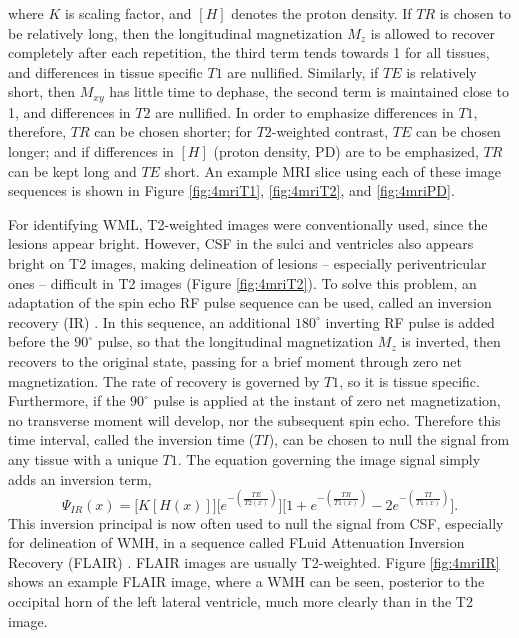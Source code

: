 where $K$ is scaling factor, and $\left[H\right]$ denotes the proton density. If $TR$ is chosen to be relatively long, then the longitudinal magnetization $M_z$ is allowed to recover completely after each repetition, the third term tends towards 1 for all tissues, and differences in tissue specific $T1$ are nullified. Similarly, if $TE$ is relatively short, then $M_{xy}$ has little time to dephase, the second term is maintained close to 1, and differences in $T2$ are nullified. In order to emphasize differences in $T1$, therefore, $TR$ can be chosen shorter; for $T2$-weighted contrast, $TE$ can be chosen longer; and if differences in $[H]$ (proton density, PD) are to be emphasized, $TR$ can be kept long and $TE$ short. An example MRI slice using each of these image sequences is shown in Figure \ref{fig:4mriT1}, \ref{fig:4mriT2}, and \ref{fig:4mriPD}.
\par
For identifying WML, T2-weighted images were conventionally used, since the lesions appear bright. However, CSF in the sulci and ventricles also appears bright on T2 images, making delineation of lesions -- especially periventricular ones -- difficult in T2 images (Figure \ref{fig:4mriT2}). To solve this problem, an adaptation of the spin echo RF pulse sequence can be used, called an inversion recovery (IR) \cite{Bydder1985}. In this sequence, an additional $180^{\circ}$ inverting RF pulse is added before the $90^{\circ}$ pulse, so that the longitudinal magnetization $M_z$ is inverted, then recovers to the original state, passing for a brief moment through zero net magnetization. The rate of recovery is governed by $T1$, so it is tissue specific. Furthermore, if the $90^{\circ}$ pulse is applied at the instant of zero net magnetization, no transverse moment will develop, nor the subsequent spin echo. Therefore this time interval, called the inversion time ($TI$), can be chosen to null the signal from any tissue with a unique $T1$. The equation governing the image signal simply adds an inversion term,
\begin{equation}\label{eq:MRI-IR}
\Psi_{IR}(x) = \bigg[K \left[H(x)\right]\bigg]\bigg[e^{-\left(\frac{TE}{T2(x)}\right)}\bigg]\bigg[1 + e^{-\left(\frac{TR}{T1(x)}\right)} - 2e^{-\left(\frac{TI}{T1(x)}\right)}\bigg].
\end{equation}
This inversion principal is now often used to null the signal from CSF, especially for delineation of WMH, in a sequence called FLuid Attenuation Inversion Recovery (FLAIR) \cite{Hajnal1992}. FLAIR images are usually T2-weighted. Figure \ref{fig:4mriIR} shows an example FLAIR image, where a WMH can be seen, posterior to the occipital horn of the left lateral ventricle, much more clearly than in the T2 image.

